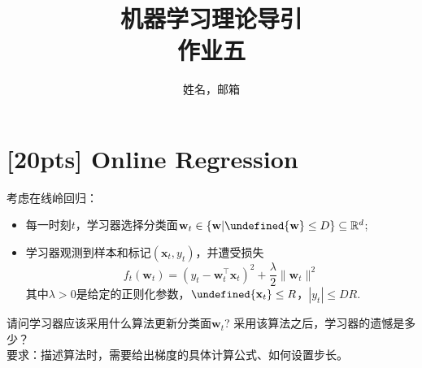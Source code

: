 \documentclass[a4paper,UTF8]{article}
\let\norm\undefined %
\DeclarePairedDelimiter\norm{\lVert}{\rVert}
\numberwithin{equation}{section}
\begin{document}
\renewcommand{\tilde}{\mathbf{w}idetilde}
\renewcommand{\hat}{\mathbf{w}idehat}

	\title{机器学习理论导引\\
		作业五}
	\author{姓名，邮箱}
	\maketitle
	
	

\section{[20pts] Online Regression}
\noindent [在线回归]考虑在线岭回归：
\begin{itemize}
  \item 每一时刻$t$，学习器选择分类面$\mathbf{w}_t \in \{\mathbf{w}| \norm{\mathbf{w}} \leq D\} \subseteq \mathbb{R}^d$;
  \item 学习器观测到样本和标记$(\mathbf{x}_t,y_t)$，并遭受损失
  \[
  f_t(\mathbf{w}_t)=(y_t -\mathbf{w}_t^\top \mathbf{x}_t)^2 + \frac{\lambda}{2} \|\mathbf{w}_t\|^2
  \]
其中$\lambda>0$是给定的正则化参数，$\norm{\mathbf{x}_t} \leq R$，$|y_t| \leq DR$.
\end{itemize}
请问学习器应该采用什么算法更新分类面$\mathbf{w}_t$? 采用该算法之后，学习器的遗憾是多少？\\
要求：描述算法时，需要给出梯度的具体计算公式、如何设置步长。
\end{document}
